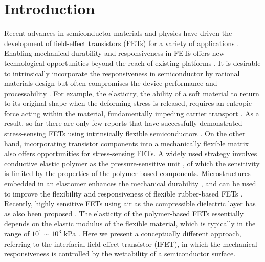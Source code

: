 

\section{Introduction}
\label{sec:small-introduction}

Recent advances in semiconductor materials and physics have
driven the development of field-effect transistors (FETs) for a
variety of applications \cite{Torsi_2013_rev,Ben_Sasson_2014_fet_rev}.  Enabling
mechanical durability and responsiveness in FETs offers new
technological opportunities beyond the reach of existing platforms
\cite{Someya_2004,Oh_2016_stretch_polym_FET,Shin_2017_air_FET}. It is desirable to intrinsically
incorporate the responsiveness in semiconductor by rational materials
design \cite{Oh_2016_stretch_polym_FET} but often compromises the device performance and
processability \cite{Lee_2018}. For example, the elasticity, the ability
of a soft material to return to its original shape when the deforming
stress is released, requires an entropic force acting within the
material, fundamentally impeding carrier transport
\cite{OConnor_2011_strain_P3HT}. As a result, so far there are only few
reports that have successfully demonstrated stress-sensing FETs using
intrinsically flexible semiconductors \cite{Oh_2016_stretch_polym_FET}. On the other hand,
incorporating transistor components into a mechanically flexible
matrix also offers opportunities for stress-sensing FETs. A widely
used strategy involves conductive elastic polymer as the
pressure-sensitive unit
\cite{Someya_2004,Sekitani_2009,Kaltenbrunner_2013_elastic_device,Takei_2010_NW_skin}, of which
the sensitivity is limited by the properties of the polymer-based
components. Microstructures embedded in an elastomer enhances the
mechanical durability \cite{Jang_2015_soft_network}, and can be used to improve the
flexibility and responsiveness of flexible rubber-based FETs
\cite{Mannsfeld_2010_pressure,Schwartz_2013_polymer_transistor}. Recently, highly sensitive FETs
using air as the compressible dielectric layer has as also been
proposed \cite{Zang_2015_suspend_gate_FET,Shin_2017_air_FET}. The elasticity of the polymer-based
FETs essentially depends on the elastic modulus of the flexible
material, which is typically in the range of \(10^{1}\sim{}10^{3}\) kPa
\cite{Amjadi_2016_stretchable_sensor}. Here we present a conceptually
different approach, referring to the interfacial field-effect
transistor (IFET), in which the mechanical responsiveness is
controlled by the wettability of a semiconductor surface.

